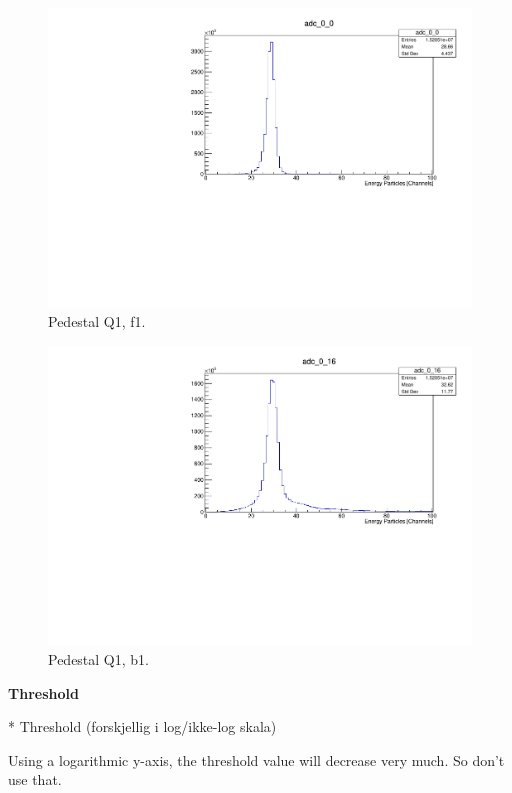 \documentclass[twoside,english]{uiofysmaster/uiofysmaster}
\begin{document}
\begin{figure}[ht]
	\centering
	\includegraphics[width=\textwidth]{../Plots/plotting/Pedestal_Q1_f1.pdf}
	\caption{Pedestal Q1, f1.}
	\label{fig:Pedestal_f}
\end{figure}

\begin{figure}[ht]
	\centering
	\includegraphics[width=\textwidth]{../Plots/plotting/Pedestal_Q1_b1.pdf}
	\caption{Pedestal Q1, b1.}
	\label{fig:Pedestal_b}
\end{figure}



\textbf{Threshold}

* Threshold (forskjellig i log/ikke-log skala)

Using a logarithmic y-axis, the threshold value will decrease very much. So don't use that. 
\end{document}
